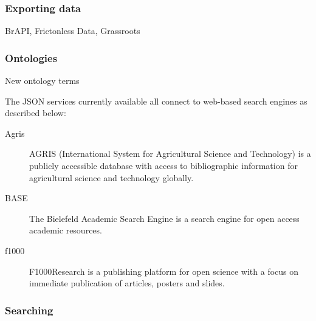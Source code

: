 \documentclass[9pt,a4paper]{extarticle}
\begin{document}
\subsubsection*{Exporting data}

BrAPI, Frictonless Data, Grassroots




\subsubsection*{Ontologies}

New ontology terms




The JSON services currently available all connect to web-based search engines as described below:

\begin{description}
\item [Agris] AGRIS\cite{Agris} (International System for Agricultural Science and Technology) is a publicly accessible database with access to bibliographic information for agricultural science and technology globally.
\item [BASE] The Bielefeld Academic Search Engine\cite{Pieper2015} is a search engine for open access academic resources.
\item [f1000] F1000Research\cite{f1000} is a publishing platform for open science with a focus on immediate publication of articles, posters and slides.
\end{description}


\subsubsection*{Searching}
\end{document}
